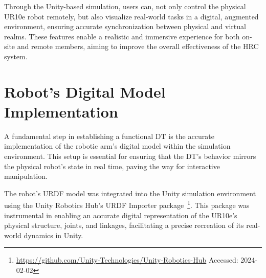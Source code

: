 Through the Unity-based simulation, users can, not only control the physical UR10e robot remotely, but also visualize real-world tasks in a digital, augmented environment, ensuring accurate synchronization between physical and virtual realms. These features enable a realistic and immersive experience for both on-site and remote members, aiming to improve the overall effectiveness of the \ac{HRC} system.







\section{Robot's Digital Model Implementation}
\label{section:digital-model}

A fundamental step in establishing a functional \ac{DT} is the accurate implementation of the robotic arm's digital model within the simulation environment. This setup is essential for ensuring that the \ac{DT}'s behavior mirrors the physical robot’s state in real time, paving the way for interactive manipulation.

The robot's \ac{URDF} model was integrated into the Unity simulation environment using the Unity Robotics Hub's \ac{URDF} Importer package~\footnote{\url{https://github.com/Unity-Technologies/Unity-Robotics-Hub} Accessed: 2024-02-02}. This package was instrumental in enabling an accurate digital representation of the UR10e’s physical structure, joints, and linkages, facilitating a precise recreation of its real-world dynamics in Unity.

